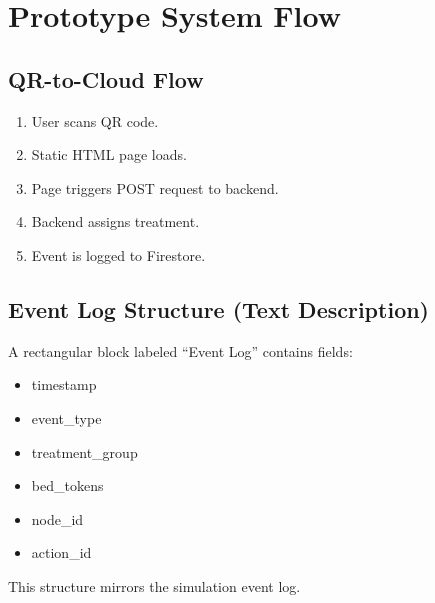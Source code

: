 \chapter{Prototype System Flow}

\section{QR-to-Cloud Flow}

\begin{enumerate}
    \item User scans QR code.
    \item Static HTML page loads.
    \item Page triggers POST request to backend.
    \item Backend assigns treatment.
    \item Event is logged to Firestore.
\end{enumerate}

\section{Event Log Structure (Text Description)}

A rectangular block labeled ``Event Log'' contains fields:

\begin{itemize}
    \item timestamp
    \item event\_type
    \item treatment\_group
    \item bed\_tokens
    \item node\_id
    \item action\_id
\end{itemize}

This structure mirrors the simulation event log.

